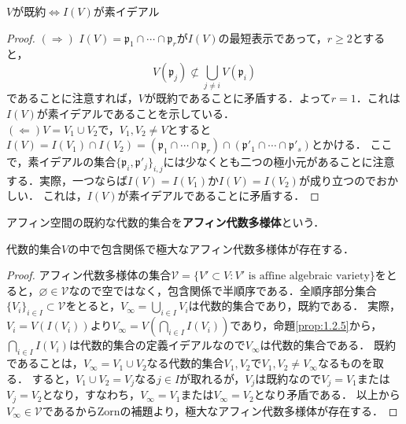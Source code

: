 \documentclass{myclass}
\begin{document}
\begin{proposition}\label{prop:1.3.2}
  $V$が既約$\Leftrightarrow$$I(V)$が素イデアル
\end{proposition}
\begin{proof}
  $(\Rightarrow)$
  $I(V) = \mathfrak{p}_1\cap \cdots \cap \mathfrak{p}_r$が$I(V)$の最短表示であって，$r\geq 2$とすると，
  \begin{equation*}
    V(\mathfrak{p}_j) \not \subset \bigcup_{j\neq i}V(\mathfrak{p}_i)
  \end{equation*}
  であることに注意すれば，$V$が既約であることに矛盾する．よって$r=1$．これは$I(V)$が素イデアルであることを示している．\\
  $(\Leftarrow)$$V=V_1\cup V_2$で，$V_1,V_2\neq V$とすると$I(V) = I(V_1)\cap I(V_2) = (\mathfrak{p}_1\cap \cdots \cap \mathfrak{p}_r)\cap (\mathfrak{p}'_1 \cap \cdots \cap \mathfrak{p}'_s)$とかける．
  ここで，素イデアルの集合$\{\mathfrak{p}_i,\mathfrak{p}'_j\}_{i,j}$には少なくとも二つの極小元があることに注意する．実際，一つならば$I(V) = I(V_1)$か$I(V) = I(V_2)$が成り立つのでおかしい．
  これは，$I(V)$が素イデアルであることに矛盾する．
\end{proof}

\begin{definition}
  アフィン空間の既約な代数的集合を\textbf{アフィン代数多様体}という．
\end{definition}

\begin{proposition}
  代数的集合$V$の中で包含関係で極大なアフィン代数多様体が存在する．
\end{proposition}
\begin{proof}
  アフィン代数多様体の集合$\mathscr{V} = \{V' \subset V : V'  \text{ is affine algebraic variety}\}$をとると，$\varnothing \in \mathscr{V}$なので空ではなく，包含関係で半順序である．全順序部分集合$\{V_i\}_{i\in I}\subset \mathscr{V}$をとると，$V_{\infty} = \bigcup_{i\in I} V_i$は代数的集合であり，既約である．
  実際，$V_{i} = V(I(V_{i}))$より$V_{\infty} = V(\bigcap_{i\in I}I(V_i))$であり，命題\ref{prop:1.2.5}から，$\bigcap_{i\in I}I(V_i)$は代数的集合の定義イデアルなので$V_{\infty}$は代数的集合である．
  既約であることは，$V_{\infty} = V_1 \cup V_2$なる代数的集合$V_1,V_2$で$V_1,V_2\neq V_{\infty}$なるものを取る．
  すると，$V_1\cup V_2 = V_{j}$なる$j\in I$が取れるが，$V_j$は既約なので$V_j = V_1$または$V_j = V_2$となり，すなわち，$V_{\infty} = V_1$または$V_{\infty} = V_2$となり矛盾である．
  以上から$V_{\infty}\in \mathscr{V}$であるからZornの補題より，極大なアフィン代数多様体が存在する．
\end{proof}
\end{document}
